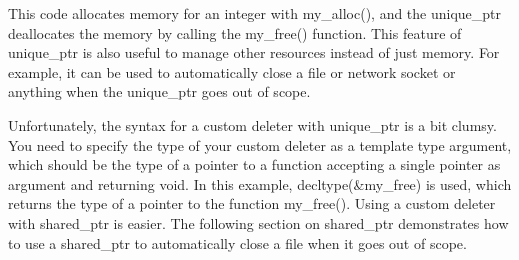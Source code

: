 This code allocates memory for an integer with my\_alloc(), and the unique\_ptr deallocates the memory by calling the my\_free() function. This feature of unique\_ptr is also useful to manage other resources instead of just memory. For example, it can be used to automatically close a file or network socket or anything when the unique\_ptr goes out of scope.

Unfortunately, the syntax for a custom deleter with unique\_ptr is a bit clumsy. You need to specify the type of your custom deleter as a template type argument, which should be the type of a pointer to a function accepting a single pointer as argument and returning void. In this example, decltype(\&my\_free) is used, which returns the type of a pointer to the function my\_free(). Using a custom deleter with shared\_ptr is easier. The following section on shared\_ptr demonstrates how to use a shared\_ptr to automatically close a file when it goes out of scope.























